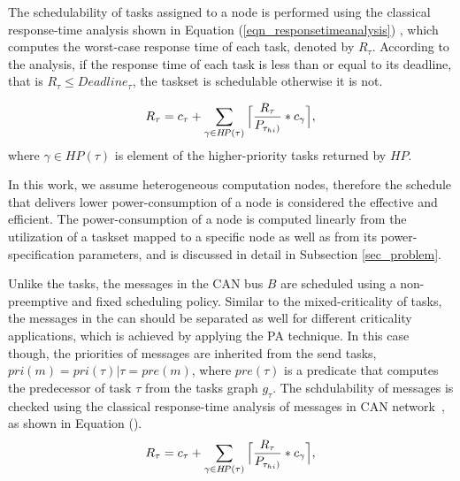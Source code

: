 The schedulability of tasks assigned to a node is performed using the classical response-time analysis shown in Equation (\ref{eqn_responsetimeanalysis}) \cite{Baruah2011Response-timeSystems,Baruah2011Response-timeSystems}, which computes the worst-case response time of each task, denoted by $R_\tau$. According to the analysis, if the response time of each task is less than or equal to its deadline, that is $R_\tau\leq Deadline_\tau$, the taskset is schedulable otherwise it is not. 

\begin{align}
\label{eqn_responsetimeanalysis}
R_\tau=c_\tau+\sum_{\gamma \in H\!P(\tau)}{\ceil[\Big]{\frac{R_\tau}{P_{\tau_{hi})}}*c_\gamma}},
\end{align}
 where $\gamma\in H\!P(\tau)$ is element of the higher-priority tasks returned by $H\!P$.

In this work, we assume heterogeneous computation nodes, therefore the schedule that delivers lower power-consumption of a node is considered the effective and efficient. The power-consumption of a node is computed linearly from the utilization of a taskset mapped to a specific node as well as from its power-specification parameters, and is discussed in detail in Subsection \ref{sec_problem}.

Unlike the tasks, the messages in the CAN bus $B$ are scheduled using a non-preemptive and fixed scheduling policy. Similar to the mixed-criticality of tasks, the messages in the can should be separated as well for different criticality applications, which is achieved by applying the PA technique. In this case though, the priorities of messages are inherited from the send tasks, $pri(m)=pri(\tau)|\tau = pre(m)$, where $pre(\tau)$ is a predicate that computes the predecessor of task $\tau$ from the tasks graph $g_\tau$. The schdulability of messages is checked using the classical response-time analysis of messages in CAN network~\cite{RobDavis-CAN-2007}, as shown in Equation ().
\begin{align}
\label{eqn_responsetimeanalysisCAN}
R_\tau=c_\tau+\sum_{\gamma \in H\!P(\tau)}{\ceil[\Big]{\frac{R_\tau}{P_{\tau_{hi})}}*c_\gamma}},
\end{align}


